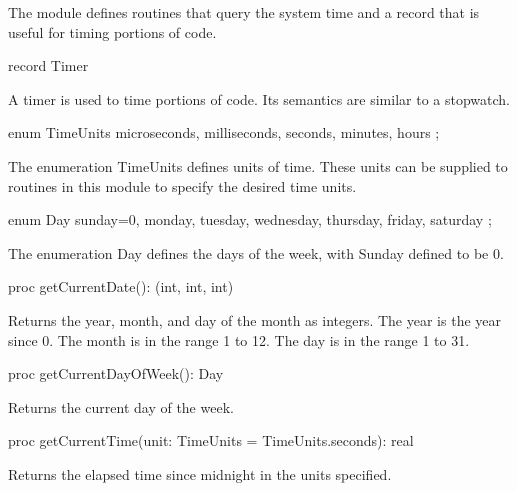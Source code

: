 \begin{protbody}
The module  defines routines that query the system time and
a record  that is useful for timing portions of code.

\vspace{1pc}

\begin{protohead}
record Timer
\end{protohead}
\begin{protobody}
A timer is used to time portions of code.  Its semantics are similar
to a stopwatch.
\end{protobody}

\begin{protohead}
enum TimeUnits { microseconds, milliseconds, seconds, minutes, hours };
\end{protohead}
\begin{protobody}
The enumeration TimeUnits defines units of time.  These units can be
supplied to routines in this module to specify the desired time units.
\end{protobody}

\begin{protohead}
enum Day { sunday=0, monday, tuesday, wednesday, thursday, friday, saturday };
\end{protohead}
\begin{protobody}
The enumeration Day defines the days of the week, with Sunday defined to be 0.
\end{protobody}

\begin{protohead}
proc getCurrentDate(): (int, int, int)
\end{protohead}
\begin{protobody}
Returns the year, month, and day of the month as integers.  The year
is the year since 0.  The month is in the range 1 to 12.  The day is
in the range 1 to 31.
\end{protobody}

\begin{protohead}
proc getCurrentDayOfWeek(): Day
\end{protohead}
\begin{protobody}
Returns the current day of the week.
\end{protobody}

\begin{protohead}
proc getCurrentTime(unit: TimeUnits = TimeUnits.seconds): real
\end{protohead}
\begin{protobody}
Returns the elapsed time since midnight in the units specified.
\end{protobody}


\end{protbody}
